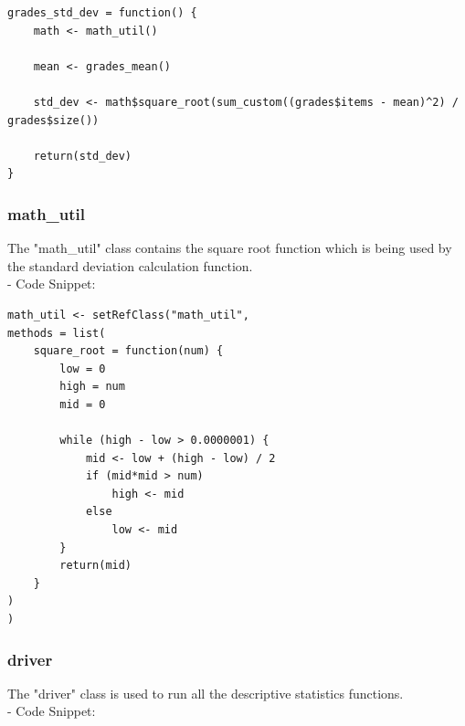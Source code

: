 \documentclass[11pt]{article}
\begin{document}
\begin{lstlisting}
grades_std_dev = function() {
    math <- math_util()

    mean <- grades_mean()

    std_dev <- math$square_root(sum_custom((grades$items - mean)^2) / grades$size())
	  
    return(std_dev)
}
\end{lstlisting}

\subsubsection{math\_util}

The "math\_util" class contains the square root function which is being used by the standard deviation calculation function.\\

- Code Snippet:\\

\begin{lstlisting}
math_util <- setRefClass("math_util",
methods = list(
    square_root = function(num) {
        low = 0
        high = num
        mid = 0

        while (high - low > 0.0000001) {
            mid <- low + (high - low) / 2
            if (mid*mid > num)
                high <- mid
            else
                low <- mid
        }    
        return(mid)
    }
)
)
\end{lstlisting}

\subsubsection{driver}
The "driver" class is used to run all the descriptive statistics functions.\\

- Code Snippet:\\
\end{document}
